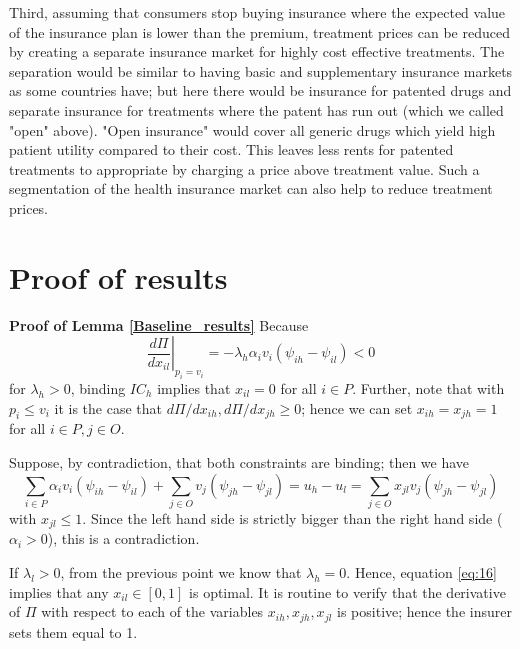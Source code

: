 \documentclass[12pt,english,a4paper]{article}
\begin{document}
Third, assuming that consumers stop buying insurance where the expected value of the insurance plan is lower than the premium, treatment prices can be reduced by creating a separate insurance market for highly cost effective treatments. The separation would be similar to having basic and supplementary insurance markets as some countries have; but here there would be insurance for patented drugs and separate insurance for treatments  where the patent has run out (which we called "open" above). "Open insurance" would cover all generic drugs which yield high patient utility compared to their cost. This leaves less rents for patented treatments to appropriate by charging a price above treatment value. Such a segmentation of the health insurance market can also help to reduce treatment prices.





\setcounter{table}{0}
\renewcommand{\thetable}{\thesection\arabic{table}}



\section{Proof of results}
\label{sec:orgf7f638b}

\textbf{Proof of Lemma \ref{Baseline_results}}
Because
\begin{equation}
\label{eq:16}
\left. \frac{d\Pi}{d x_{il}}\right|_{p_i=v_i} = - \lambda_h \alpha_i v_i (\psi_{ih}-\psi_{il}) < 0
\end{equation}
for \(\lambda_h >0\), binding \(IC_h\) implies that \(x_{il} =0\) for all \(i \in P\). Further, note that with \(p_i \leq v_i\) it is the case that \(d \Pi/d x_{ih}, d \Pi/d x_{jh} \geq 0\); hence we can set \(x_{ih} = x_{jh} =1\) for all \(i \in P, j \in O\).

Suppose, by contradiction, that both constraints are binding; then we have
\begin{equation}
\label{eq:17}
 \sum_{i \in P} \alpha_i v_i (\psi_{ih}-\psi_{il}) + \sum_{j \in O} v_j (\psi_{jh}-\psi_{jl})  = u_h - u_l = \sum_{j \in O} x_{jl} v_j (\psi_{jh}-\psi_{jl})
\end{equation}
with \(x_{jl} \leq 1\). Since the left hand side is strictly bigger than the right hand side (\(\alpha_i > 0\)), this is a contradiction.

If \(\lambda_l >0\), from the previous point we know that \(\lambda_h = 0\). Hence, equation \eqref{eq:16} implies that any \(x_{il} \in [0,1]\) is optimal. It is routine to verify that the derivative of \(\Pi\) with respect to each of the variables \(x_{ih},x_{jh},x_{jl}\) is positive; hence the insurer sets them equal to 1.
\end{document}
